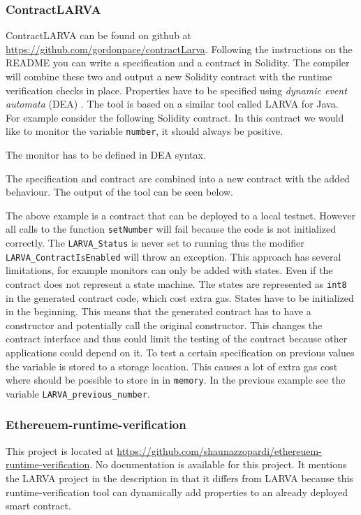 \documentclass[a4paper]{article}
\begin{document}
\subsubsection{ContractLARVA}
ContractLARVA can be found on github at \url{https://github.com/gordonpace/contractLarva}. Following the instructions on the README you can write a specification and a contract in Solidity. The compiler will combine these two and output a new Solidity contract with the runtime verification checks in place. Properties have to be specified using \textit{dynamic event automata} (DEA) \cite{CGG08FMICS}. The tool is based on a similar tool called LARVA for Java. \\
For example consider the following Solidity contract. In this contract we would like to monitor the variable \texttt{number}, it should always be positive.

The monitor has to be defined in DEA syntax.

The specification and contract are combined into a new contract with the added behaviour. The output of the tool can be seen below.

The above example is a contract that can be deployed to a local testnet. However all calls to the function \texttt{setNumber} will fail because the code is not initialized correctly. The \texttt{LARVA\_Status} is never set to running thus the modifier \texttt{LARVA\_ContractIsEnabled} will throw an exception. This approach has several limitations, for example monitors can only be added with states. Even if the contract does not represent a state machine. The states are represented as \texttt{int8} in the generated contract code, which cost extra gas. States have to be initialized in the beginning. This means that the generated contract has to have a constructor and potentially call the original constructor. This changes the contract interface and thus could limit the testing of the contract because other applications could depend on it. To test a certain specification on previous values the variable is stored to a storage location. This causes a lot of extra gas cost where should be possible to store in in \texttt{memory}. In the previous example see the variable \texttt{LARVA\_previous\_number}.

\subsubsection{Ethereuem-runtime-verification}
This project is located at \url{https://github.com/shaunazzopardi/ethereuem-runtime-verification}. No documentation is available for this project. It mentions the LARVA project in the description in that it differs from LARVA because this runtime-verification tool can dynamically add properties to an already deployed smart contract.
\end{document}
